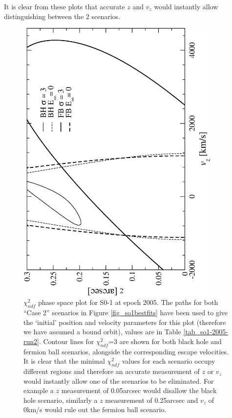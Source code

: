 It is clear from these plots that accurate $z$ and $v_z$ would instantly allow distinguishing between the 2 scenarios.
\begin{figure}[!p]
	\begin{center}
	\includegraphics[angle=-90,width=0.9\textwidth]{eps/phasespace-2005-run2-so1.eps}
	\caption{$\chi^2_{ndf}$ phase space plot for S0-1 at epoch 2005. The paths for both ``Case 2'' scenarios in Figure
	\ref{fig_so1bestfits} have been used to give the `initial' position and velocity parameters for this plot (therefore we have
	assumed a bound orbit), values are in Table \ref{tab_so1-2005-run2}.
	Contour lines for $\chi^2_{ndf}$=3 are shown for both black hole and fermion ball scenarios, alongside
	the corresponding escape velocities.
	It is clear that the minimal $\chi^2_{ndf}$ values for each scenario occupy different regions
	and therefore an accurate measurement of $z$ or $v_z$ would instantly allow one of the scenarios to be eliminated. For example a
	$z$ measurement of 0.05arcsec would disallow the black hole scenario, similarly a $z$ measurement of 0.25arcsec and $v_z$
	of 0km/s would rule out the fermion ball scenario.}
	\label{fig_so1-2005-run2}
	\end{center}
\end{figure}
